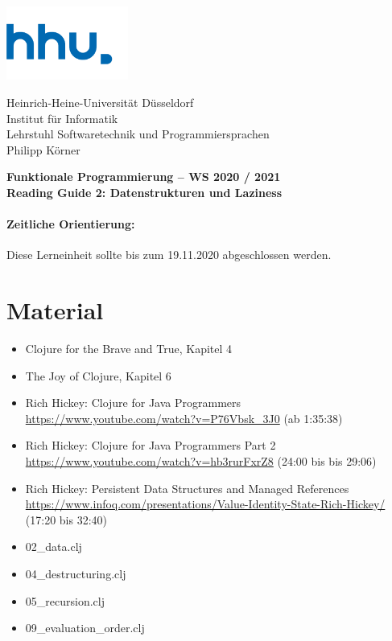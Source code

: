 \documentclass[11pt,a4paper]{article}
\theoremstyle{break}
\begin{document}
\begin{minipage}[b]{\textwidth}
\parbox[t]{5cm}{%
\includegraphics[width=4cm]{unilogo}
\hfill
}
\parbox[b]{11cm}{%
Heinrich-Heine-Universit\"at D\"usseldorf\\
Institut f\"ur Informatik\\
Lehrstuhl Softwaretechnik und Programmiersprachen\\
Philipp K\"orner
}

\end{minipage}
\begin{center}
\bf
Funktionale Programmierung -- WS 2020 / 2021\\
Reading Guide 2: Datenstrukturen und Laziness
\end{center}

\pagestyle{empty}

\paragraph{Zeitliche Orientierung:} Diese Lerneinheit sollte bis zum 19.11.2020 abgeschlossen werden.

\section{Material} 

\begin{itemize}
\item Clojure for the Brave and True, Kapitel 4
\item The Joy of Clojure, Kapitel 6
\item Rich Hickey: Clojure for Java Programmers \url{https://www.youtube.com/watch?v=P76Vbsk_3J0} (ab 1:35:38)
\item Rich Hickey: Clojure for Java Programmers Part 2 \url{https://www.youtube.com/watch?v=hb3rurFxrZ8} (24:00 bis bis 29:06)
\item Rich Hickey: Persistent Data Structures and Managed References \url{https://www.infoq.com/presentations/Value-Identity-State-Rich-Hickey/} (17:20 bis 32:40)
\item 02\_data.clj
\item 04\_destructuring.clj
\item 05\_recursion.clj 
\item 09\_evaluation\_order.clj
\end{itemize}
\end{document}
